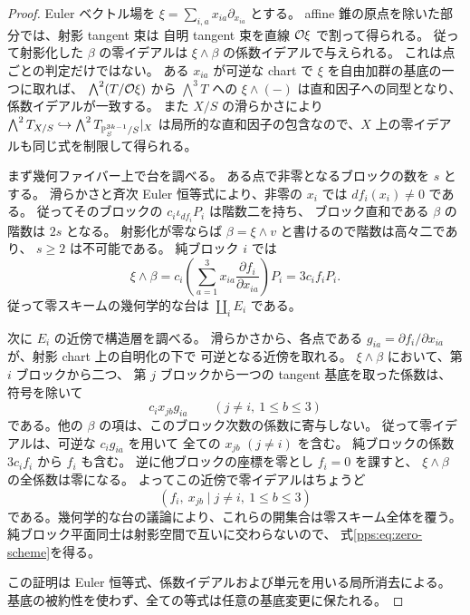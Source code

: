 \begin{proof}
Euler ベクトル場を
$\xi=\sum_{i,a}x_{ia}\partial_{x_{ia}}$ とする。
affine 錐の原点を除いた部分では、射影 tangent 束は
自明 tangent 束を直線 $\mathcal O\xi$ で割って得られる。
従って射影化した $\beta$ の零イデアルは
$\xi\wedge\beta$ の係数イデアルで与えられる。
これは点ごとの判定だけではない。
ある $x_{ia}$ が可逆な chart で $\xi$ を自由加群の基底の一つに取れば、
$\bigwedge^2(T/\mathcal O\xi)$ から $\bigwedge^3T$ への
$\xi\wedge(-)$ は直和因子への同型となり、係数イデアルが一致する。
また $X/S$ の滑らかさにより
$\bigwedge^2T_{X/S}\hookrightarrow
 \bigwedge^2T_{\mathbb P^{3k-1}_S/S}|_X$
は局所的な直和因子の包含なので、$X$ 上の零イデアルも同じ式を制限して得られる。

まず幾何ファイバー上で台を調べる。
ある点で非零となるブロックの数を $s$ とする。
滑らかさと斉次 Euler 恒等式により、非零の $x_i$ では
$df_i(x_i)\ne0$ である。
従ってそのブロックの $c_i\iota_{df_i}P_i$ は階数二を持ち、
ブロック直和である $\beta$ の階数は $2s$ となる。
射影化が零ならば $\beta=\xi\wedge v$ と書けるので階数は高々二であり、
$s\ge2$ は不可能である。
純ブロック $i$ では
\[
 \xi\wedge\beta
   =c_i\left(\sum_{a=1}^3x_{ia}\frac{\partial f_i}{\partial x_{ia}}\right)P_i
   =3c_if_iP_i.
\]
従って零スキームの幾何学的な台は $\coprod_iE_i$ である。

次に $E_i$ の近傍で構造層を調べる。
滑らかさから、各点である
$g_{ia}=\partial f_i/\partial x_{ia}$ が、射影 chart 上の自明化の下で
可逆となる近傍を取れる。
$\xi\wedge\beta$ において、第 $i$ ブロックから二つ、
第 $j$ ブロックから一つの tangent 基底を取った係数は、
符号を除いて
\begin{equation}\label{pps:eq:transverse-coefficient}
 c_i x_{jb}g_{ia}\qquad(j\ne i,\ 1\le b\le3)
\end{equation}
である。他の $\beta$ の項は、このブロック次数の係数に寄与しない。
従って零イデアルは、可逆な $c_ig_{ia}$ を用いて
全ての $x_{jb}$ $(j\ne i)$ を含む。
純ブロックの係数 $3c_if_i$ から $f_i$ も含む。
逆に他ブロックの座標を零とし $f_i=0$ を課すと、
$\xi\wedge\beta$ の全係数は零になる。
よってこの近傍で零イデアルはちょうど
\[
 (f_i,\ x_{jb}\mid j\ne i,\ 1\le b\le3)
\]
である。幾何学的な台の議論により、これらの開集合は零スキーム全体を覆う。
純ブロック平面同士は射影空間で互いに交わらないので、
式\eqref{pps:eq:zero-scheme}を得る。

この証明は Euler 恒等式、係数イデアルおよび単元を用いる局所消去による。
基底の被約性を使わず、全ての等式は任意の基底変更に保たれる。
\end{proof}

